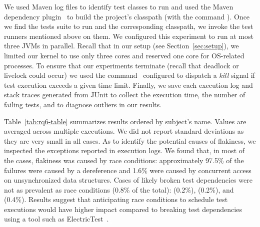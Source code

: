 \documentclass[10pt,journal,compsoc]{IEEEtran}
\begin{document}
We used Maven log files to identify test classes to run and used the
Maven dependency plugin~\cite{maven-dep} to build the project's
classpath (with the command ).
Once we find the tests suite to run and the corresponding classpath,
we invoke the test runners mentioned above on them.  We configured
this experiment to run at most three JVMs in parallel.  Recall that in
our setup (see Section~\ref{sec:setup}), we limited our kernel to use
only three cores and reserved one core for OS-related processes.  To
ensure that our experiments terminate (recall that deadlock or
livelock could occur) we used the 
command~\cite{timeout-cmd} configured to dispatch a \emph{kill} signal
if test execution exceeds a given time limit. Finally, we save each
execution log and stack traces generated from JUnit to collect the
execution time, the number of failing tests, and to diagnose outliers
in our results.

\sloppy Table~\ref{tab:rq6-table} summarizes results ordered by
subject's name.  Values are averaged across multiple executions.  We
did not report standard deviations as they are very small in all
cases.  As to identify the potential causes of flakiness, we inspected
the exceptions reported in execution logs. We found that, in most
of the cases, flakiness was caused by race conditions: approximately
97.5\% of the failures were caused by a  dereference and 1.6\% were
caused by concurrent access on unsynchronized data structures.  Cases of likely
broken test dependencies were not as prevalent as race conditions
(0.8\% of the total):  (0.2\%),
 (0.2\%), and
 (0.4\%). Results suggest that
anticipating race conditions to schedule test executions would have
higher impact compared to breaking test dependencies using a tool such
as ElectricTest~\cite{bell-etal-esecfse2015}.
\end{document}
